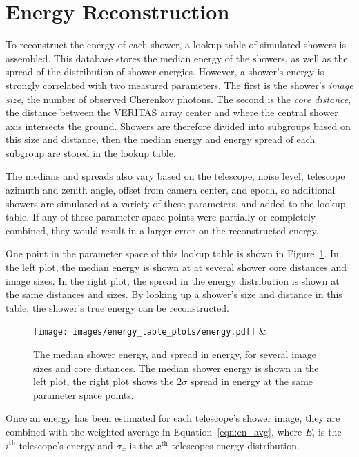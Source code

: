 \FloatBarrier

\section{Energy Reconstruction}\label{subsec:enrecon}

To reconstruct the energy of each shower, a lookup table of simulated showers is assembled.
This database stores the median energy of the showers, as well as the spread of the distribution of shower energies.
However, a shower's energy is strongly correlated with two measured parameters.
The first is the shower's \textit{image size}, the number of observed Cherenkov photons.
The second is the \textit{core distance}, the distance between the VERITAS array center and where the central shower axis intersects the ground.
Showers are therefore divided into subgroups based on this size and distance, then the median energy and energy spread of each subgroup are stored in the lookup table.

The medians and spreads also vary based on the telescope, noise level, telescope azimuth and zenith angle, offset from camera center, and epoch, so additional showers are simulated at a variety of these parameters, and added to the lookup table.
If any of these parameter space points were partially or completely combined, they would result in a larger error on the reconstructed energy.

One point in the parameter space of this lookup table is shown in Figure~\ref{fig:energy_params}.
In the left plot, the median energy is shown at at several shower core distances and image sizes.
In the right plot, the spread in the energy distribution is shown at the same distances and sizes.
By looking up a shower's size and distance in this table, the shower's true energy can be reconstructed.

\begin{figure}[bh]
  \centering
  \texttt{[image: images/energy\_table\_plots/energy.pdf]} &
  \caption[Energy Table Parameters]{
    The median shower energy, and spread in energy, for several image sizes and core distances.
    The median shower energy is shown in the left plot, the right plot shows the $2\sigma$ spread in energy at the same parameter space points.
  }
  \label{fig:energy_params}
\end{figure}

Once an energy has been estimated for each telescope's shower image, they are combined with the weighted average in Equation~\ref{eqn:en_avg}, where $E_i$ is the $i^{\textrm{th}}$ telescope's energy and $\sigma_x$ is the $x^{\textrm{th}}$ telescopes energy distribution.


